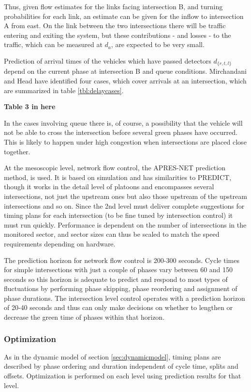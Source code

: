 Thus, given flow estimates for the links facing intersection B, and
turning probabilities for each link, an estimate can be given for the
inflow to intersection A from east. On the link between the two
intersections there will be traffic entering and exiting the system,
but these contributions - and losses - to the traffic, which can be
measured at $d_a$, are expected to be very small.

Prediction of arrival times of the vehicles which have passed detectors
$d_{\lbrace r,t,l \rbrace}$ depend on the current phase at
intersection B and queue conditions. Mirchandani and Head have
identified four cases, which cover arrivals at an intersection, which
are summarized in table \ref{tbl:delaycases}.

\begin{center}
{\bf Table 3 in here}
\end{center}

In the cases involving queue there is, of course, a possibility that
the vehicle will not be able to cross the intersection before several
green phases have occurred. This is likely to happen under high
congestion when intersections are placed close together.

At the mesoscopic level, network flow control, the APRES-NET
prediction method, is used. It is based on simulation and has
similarities to PREDICT, though it works in the detail level of
platoons and encompasses several intersections, not just the upstream
ones but also those upstream of the upstream intersections and so
on. Since the 2nd level must deliver complete suggestions for timing
plans for each intersection (to be fine tuned by intersection control)
it must run quickly. Performance is dependent on the number of
intersections in the monitored sector, and sector sizes can thus be
scaled to match the speed requirements depending on hardware.

The prediction horizon for network flow control is 200-300
seconds. Cycle times for simple intersections with just a couple of
phases vary between 60 and 150 seconds so this horizon is adequate to
predict and respond to most types of fluctuations by performing phase
skipping, phase reordering and assignment of phase durations. The
intersection level control operates with a prediction horizon of 20-40
seconds and thus can only make decisions on whether to lengthen or
decrease the green time of phases within that horizon.

\subsubsection*{Optimization}
As in the dynamic model of section \ref{sec:dynamicmodel}, timing
plans are described by phase ordering and duration independent of
cycle time, splits and offsets.  Optimization is performed on each
level using prediction results for that level.

